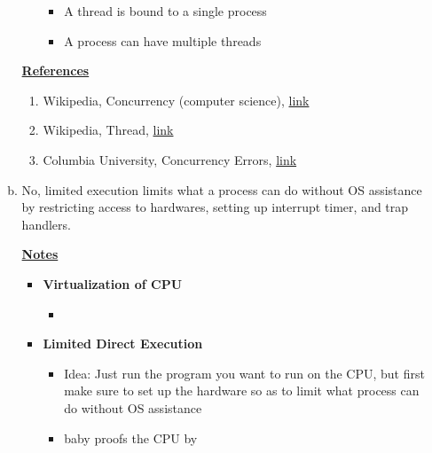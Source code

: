 \documentclass[12pt]{article}
\begin{document}
\begin{enumerate}[1.]
\begin{enumerate}[a)]
\begin{itemize}
\begin{itemize}
                \item A thread is bound to a single process
                \item A process can have multiple threads
            \end{itemize}
        \end{itemize}

        \bigskip

        \underline{\textbf{References}}

        \begin{enumerate}[1)]
            \item Wikipedia, Concurrency (computer science), \href{https://en.wikipedia.org/wiki/Concurrency_(computer_science)}{link}
            \item Wikipedia, Thread, \href{https://en.wikipedia.org/wiki/Thread_(computing)#:~:text=In%20computer%20science%2C%20a%20thread,part%20of%20the%20operating%20system.}{link}
            \item Columbia University, Concurrency Errors, \href{https://www.cs.columbia.edu/~junfeng/13fa-w4118/lectures/l11-concurrency-error.pdf}{link}
        \end{enumerate}


        \item

        \bigskip

        No, limited execution limits what a process can do without OS assistance
        by restricting access to hardwares, setting up interrupt timer, and trap handlers.

        \bigskip

        \underline{\textbf{Notes}}

        \begin{itemize}
            \item \textbf{Virtualization of CPU}

            \begin{itemize}
                \item
            \end{itemize}
            \item \textbf{Limited Direct Execution}

            \begin{itemize}
                \item Idea: Just run the program you want to run on the CPU,
                but first make sure to set up the hardware so as to limit what
                process can do without OS assistance
                \item baby proofs the CPU by


\end{itemize}
\end{itemize}
\end{enumerate}
\end{enumerate}
\end{document}
